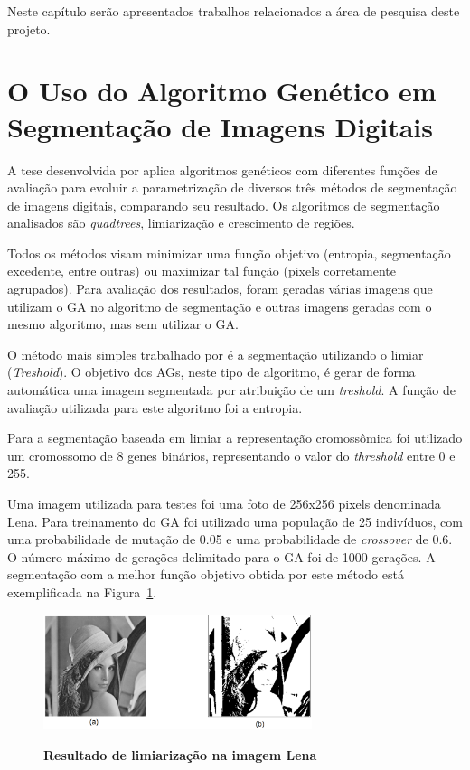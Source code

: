 \documentclass[12pt,oneside,a4paper,english,french,spanish,brazil,]{abntex2}
\begin{document}
Neste capítulo serão apresentados trabalhos relacionados a área de pesquisa deste projeto.


\section{O Uso do Algoritmo Genético em Segmentação de Imagens Digitais}

A tese desenvolvida por \citet{matias:2007} aplica algoritmos genéticos com diferentes funções de avaliação para evoluir a parametrização de diversos três métodos de segmentação de imagens digitais, comparando seu resultado. Os algoritmos de segmentação analisados são \textit{quadtrees}, limiarização e crescimento de regiões.

Todos os métodos visam minimizar uma função objetivo (entropia, segmentação excedente, entre outras) ou maximizar tal função (pixels corretamente agrupados). Para avaliação dos resultados, foram geradas várias imagens que utilizam o GA no algoritmo de segmentação e outras imagens geradas com o mesmo algoritmo, mas sem utilizar o GA. 

O método mais simples trabalhado por \citet{matias:2007} é a segmentação utilizando o limiar (\textit{Treshold}). O objetivo dos AGs, neste tipo de algoritmo, é gerar de forma automática uma imagem segmentada por atribuição de um \textit{treshold}. A função de avaliação utilizada para este algoritmo foi a entropia.

Para a segmentação baseada em limiar a representação cromossômica foi utilizado um cromossomo de 8 genes binários, representando o valor do \textit{threshold} entre 0 e 255. 

Uma imagem utilizada para testes foi uma foto de 256x256 pixels denominada Lena. Para treinamento do GA foi utilizado uma população de 25 indivíduos, com uma probabilidade de mutação de 0.05 e uma probabilidade de \textit{crossover} de 0.6. O número máximo de gerações delimitado para o GA foi de 1000 gerações. A segmentação com a melhor função objetivo obtida por este método está exemplificada na Figura~\ref{fig:TrCo_Matias_Limiar_1}.

\begin{figure}[ht]
\centering
\caption{\textbf{Resultado de limiarização na imagem Lena}}
\includegraphics[width=0.7\textwidth]{imagens/TrCo_Matias_Limiar_1.PNG}
\label{fig:TrCo_Matias_Limiar_1}
\end{figure}
\end{document}
